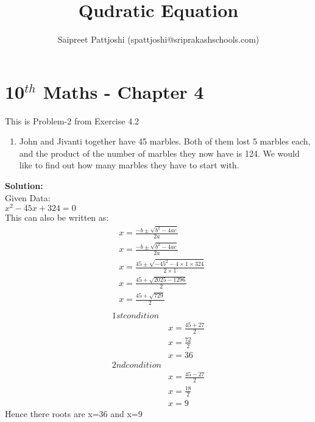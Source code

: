 \documentclass[12pt]{article}
\title{Qudratic Equation}
\author{Saipreet Pattjoshi (spattjoshi@sriprakashschools.com)}
\newcommand{\solution}{\noindent \textbf{Solution: }}
\begin{document}
\maketitle
\section*{10$^{th}$ Maths - Chapter 4}
This is Problem-2 from Exercise 4.2
\begin{enumerate}
\item John and Jivanti together have 45 marbles. Both of them lost 5 marbles each, and the product of the number of marbles they now have is 124. We would like to find out how many marbles they have to start with.
\end{enumerate}
\solution \\
Given Data:\\
${x^2-45x+324=0}$ \\
This can also be written as:
\begin{align}
&x=\frac{-b\pm\sqrt{b^2-4ac}}{2a}\\
&x=\frac{-b\pm\sqrt{b^2-4ac}}{2a}\\
&x=\frac{45\pm\sqrt{-45^2-4 \times 1\times324}}{2 \times 1}\\
&x=\frac{45+\sqrt{2025-1296}}{2}\\
&x=\frac{45+\sqrt{729}}{2}\\
\end{align}
\begin{align}
1st condition\\
&x=\frac{45+27}{2}\\
&x=\frac{72}{2}\\
&x=36\\
2nd condition\\
&x=\frac{45-27}{2}\\
&x=\frac{18}{2}\\
&x=9
\end{align}
Hence there roots are x=36 and x=9
\end{document}
